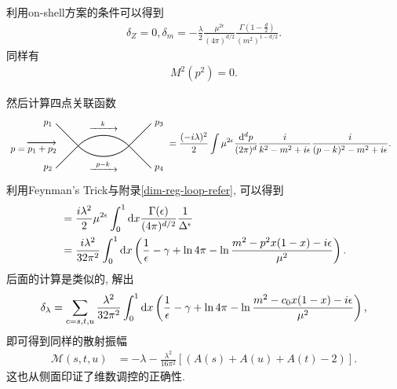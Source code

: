利用on-shell方案的条件可以得到
\begin{align}
    \delta_Z=0, \delta_m=-\frac{\lambda}{2}\frac{\mu^{2\epsilon}}{(4\pi)^{d/2}}\frac{\Gamma(1-\frac d2)}{(m^2)^{1-d/2}}.
\end{align}
同样有
\begin{align}
    M^2(p^2)=0.
\end{align}

然后计算四点关联函数
\begin{align}
    \begin{tikzpicture}[baseline=(current bounding box.center), scale=1.2]
        \coordinate (v1) at (-0.8,0);
        \coordinate (v2) at (0.8,0);
        \draw[thick] (-1.5, 0.7) -- (v1) node[pos=0, left] {$p_1$};
        \draw[thick] (-1.5,-0.7) -- (v1) node[pos=0, left] {$p_2$};
        \draw[thick] (v2) -- (1.5, 0.7) node[pos=1, right] {$p_3$};
        \draw[thick] (v2) -- (1.5,-0.7) node[pos=1, right] {$p_4$};
        \draw[thick] (v1) to[out=45,in=135] node[inner sep=0.5pt, label=above:$\xrightarrow{\quad k \quad}$] {} (v2);
        \draw[thick] (v1) to[out=-45,in=-135] node[inner sep=0.5pt, label=below:$\xrightarrow{\;\; p-k \;\;}$] {} (v2);
        \node at (-2.2, 0.1) [below] {$p = p_1 + p_2$};
        \draw[->, thick] (-2.4, 0.1) -- (-1.5, 0.1);
    \end{tikzpicture}
    &=\frac{(-i\lambda)^2}{2}\int\mu^{2\epsilon}\nd dp \frac{i}{k^2 - m^2 + i\epsilon} \frac{i}{(p-k)^2 - m^2 + i\epsilon}.
\end{align}
利用Feynman's Trick与附录\ref{dim-reg-loop-refer}, 可以得到
\begin{align}
    &=\frac{i\lambda^2}{2}\mu^{2\epsilon}\int_0^1\mathrm dx\frac{\Gamma(\epsilon)}{(4\pi)^{d/2}}\frac1{\Delta^\epsilon}\\
    &=\frac{i\lambda^2}{32\pi^2}\int_0^1\mathrm dx\left(\frac1\epsilon-\gamma+\ln4\pi-\ln\frac{m^2-p^2x(1-x)-i\epsilon}{\mu^2}\right).
\end{align}
后面的计算是类似的, 解出
\begin{align}
    \delta_\lambda=\sum_{c=s, t, u}\frac{\lambda^2}{32\pi^2}\int_0^1\mathrm dx\left(\frac1\epsilon-\gamma+\ln4\pi-\ln\frac{m^2-c_0x(1-x)-i\epsilon}{\mu^2}\right),
\end{align}
即可得到同样的散射振幅
\begin{align}
    \mathcal M(s, t, u)&=-\lambda-\frac{\lambda^2}{16\pi^2}\left[(A(s)+A(u)+A(t)-2)\right].
\end{align}
这也从侧面印证了维数调控的正确性.

